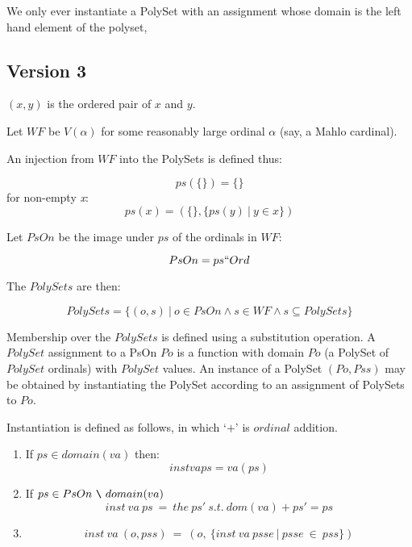 \documentclass[numreferences]{rbjk}
\begin{document}
\begin{article}
We only ever instantiate a PolySet with an assignment whose domain is the left hand element of the polyset,

\subsection{Version 3}

$(x,y)$ is the ordered pair of $x$ and $y$.

Let $WF$ be $V(\alpha)$ for some reasonably large ordinal $\alpha$ (say, a Mahlo cardinal).

An injection from $WF$ into the PolySets is defined thus:

\begin{displaymath}
ps(\{\}) = \{\}
\end{displaymath}
for non-empty \emph{x}:
\begin{displaymath}
ps(x) = (\{\}, \{ ps(y)\ |\ y \in x\})
\end{displaymath}

Let $PsOn$ be the image under $ps$ of the ordinals in $WF$:

\begin{displaymath}
PsOn = ps `` Ord
\end{displaymath}

The $PolySets$ are then:

\begin{displaymath}
PolySets = \{(o,s)\ |\ o \in PsOn \land s \in WF \land s \subseteq PolySets\}
\end{displaymath}

Membership over the $PolySets$ is defined using a substitution operation.
A $PolySet$ assignment to a PsOn $Po$ is a function with domain $Po$ (a PolySet of $PolySet$ ordinals) with $PolySet$ values.
An instance of a PolySet $(Po, Pss)$ may be obtained by instantiating the PolySet according to an assignment of PolySets to $Po$.

Instantiation is defined as follows, in which `$+$' is $ordinal$ addition.

\begin{enumerate}
\item
If $ps \in domain(va)$ then:
\begin{displaymath}
 inst va ps = va (ps)
\end{displaymath}
\item
If $ps \in PsOn\ \verb!\!\ domain(va)$
\begin{displaymath}
 inst\ va\ ps\ =\ the\ ps'\ s.t.\ dom(va)+ps'=ps
\end{displaymath}
\item
\begin{displaymath}
inst\ va\ (o,pss)\ =\ (o,\ \{inst\ va\ psse\ |\ psse\ \in\ pss\})
\end{displaymath} 
\end{enumerate}


\end{article}
\end{document}
